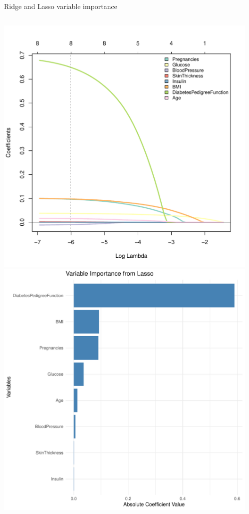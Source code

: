 \begin{frame}{Ridge and Lasso variable importance}

\vspace*{-1em}\begin{columns}[T]
\begin{column}{0.5\textwidth}
\includegraphics[width=0.85\columnwidth]{plots/diabetes_lasso.pdf}
\includegraphics[width=0.7\columnwidth]{plots/variable_importance_lasso.pdf}
\end{column}
\begin{column}{0.5\textwidth}

\end{column}
\end{columns}
\end{frame}
